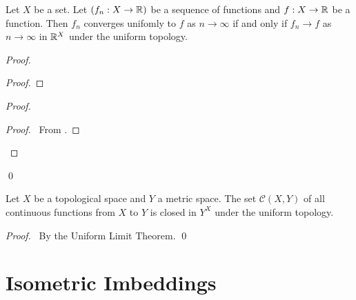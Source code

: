 \begin{proposition}
    Let $X$ be a set. Let $(f_n : X \rightarrow \mathbb{R})$ be a sequence of functions and $f : X \rightarrow \mathbb{R}$ be a function.
    Then $f_n$ converges unifomly to $f$ as $n \rightarrow \infty$ if and only if $f_n \rightarrow f$ as $n \rightarrow \infty$
    in $\mathbb{R}^X$ under the uniform topology.
\end{proposition}

\begin{proof}
    \pf
    \begin{proof}
    \end{proof}
    \begin{proof}
        \begin{proof}
            \pf\ From .
        \end{proof}
    \end{proof}
    \qed
\end{proof}

\begin{corollary}
    Let $X$ be a topological space and $Y$ a metric space. The set $\mathcal{C}(X,Y)$ of all continuous functions from $X$ to $Y$
    is closed in $Y^X$ under the uniform topology.
\end{corollary}

\begin{proof}
    \pf\ By the Uniform Limit Theorem. \qed
\end{proof}


\section{Isometric Imbeddings}

